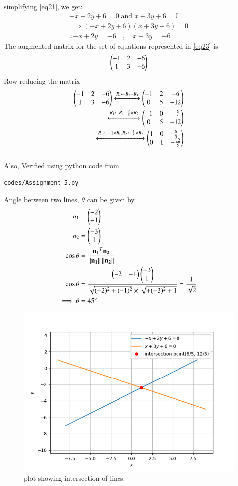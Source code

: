 \documentclass[journal,12pt,twocolumn]{IEEEtran}
\begin{document}
simplifying \ref{eq21}, we get:
\begin{align}
	\label{eq22}-x + 2y + 6 = 0 \text{ and } x + 3y + 6 = 0\\
	\implies (-x + 2y + 6)(x + 3y + 6) = 0\\
	\therefore -x+2y=-6 \quad , \quad x+3y=-6\label{eq23}
\end{align}
The augmented matrix for the set of equations represented in \eqref{eq23} is
\begin{align}
\begin{pmatrix}-1&2&-6\\1&3&-6\end{pmatrix}
\end{align}
Row reducing the matrix
\begin{align}
 \begin{pmatrix}-1&2&-6\\1&3&-6\end{pmatrix}\xleftrightarrow[]{R_2\leftarrow R_2+R_1}\begin{pmatrix}-1&2&-6\\0&5&-12\end{pmatrix}\\
 \xleftrightarrow[]{R_1\leftarrow R_1-\frac{2}{5}\times R_2}\begin{pmatrix}-1&0&-\frac{6}{5}\\0&5&-12\end{pmatrix}\\
 \xleftrightarrow[]{R_1\leftarrow -1\times R_1  , R_2\leftarrow \frac{1}{5}\times R_2}\begin{pmatrix}1&0&\frac{6}{5}\\0&1&-\frac{12}{5}\end{pmatrix}
\end{align}
\\
Also, Verified using python code from
\begin{lstlisting}
codes/Assignment_5.py
\end{lstlisting}
Angle between two lines, $\theta$ can be given by
\begin{align}
n_1&=\begin{pmatrix}-2\\-1\end{pmatrix}\\
n_2&=\begin{pmatrix}-3\\1\end{pmatrix}\\
\cos \theta &= \frac{\mathbf{n_1}^T\mathbf{n_2}}{\left\lVert\mathbf{n_1}\right\rVert\left\lVert\mathbf{n_2}\right\rVert}\\
\cos \theta&=\frac{\begin{pmatrix}-2&-1\end{pmatrix}\begin{pmatrix}-3\\1\end{pmatrix}}{\sqrt{(-2)^2 +(-1)^2} \times \sqrt{+(-3)^2+1}}=\frac{1}{\sqrt{2}}\\
\implies \theta &= 45\degree
\end{align}
\begin{figure}[!h]
\centering
\includegraphics[width=\columnwidth]{Figure_1.png}
\caption{plot showing intersection of lines.}
\label{Fig_1}
\end{figure}
\end{document}
